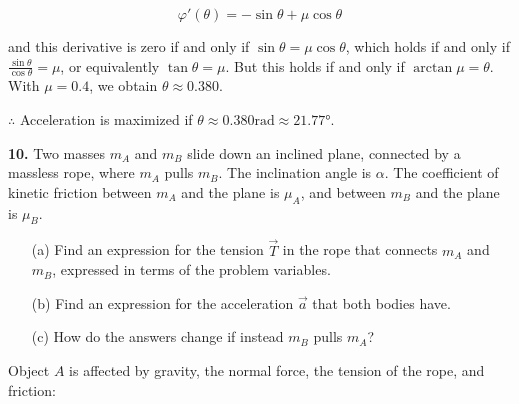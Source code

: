 \documentclass[12pt]{article}
\theoremstyle{definition}
\begin{document}
\begin{equation}
    \varphi'(\theta) = -\sin \theta + \mu \cos \theta
\end{equation}

and this derivative is zero if and only if $\sin \theta = \mu \cos
\theta$, which holds if and only if $\frac{\sin \theta}{\cos \theta} = \mu$, or
equivalently $\tan \theta = \mu$. But this holds if and only if 
$\arctan \mu = \theta$. With $\mu = 0.4$, we obtain $\theta \approx 0.380$.

$\therefore $ Acceleration is maximized if $\theta \approx 0.380 \text{rad}
\approx \ang{21.77}$.


\pagebreak 

\begin{shaded}
\textbf{10.} Two masses $m_A$ and $m_B$ slide down an inclined plane, connected
by a massless rope, where $m_A$ pulls $m_B$. The inclination angle is $\alpha$.
The coefficient of kinetic friction between $m_A$ and the plane is $\mu_A$, and
between $m_B$ and the plane is $\mu_B$.  

\begin{enumerate}
    \item[(a)] Find an expression for the tension $\vec{T}$ in the rope that connects $m_A$ and $m_B$, expressed in terms of the problem variables.
    \item[(b)] Find an expression for the acceleration $\vec{a}$ that both bodies have.
    \item[(c)] How do the answers change if instead $m_B$ pulls $m_A$?
\end{enumerate}

\begin{center}
\end{center}
\end{shaded}

Object $A$ is affected by gravity, the normal force, the tension of the
rope, and friction:
\end{document}
